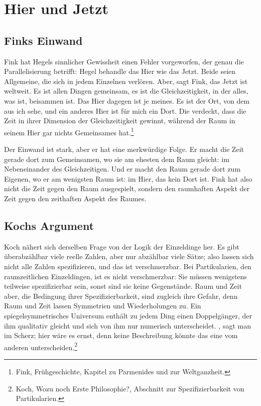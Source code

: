 \chapter{Hier und Jetzt}

\section{Finks Einwand}

Fink hat Hegels sinnlicher Gewissheit einen Fehler vorgeworfen, der genau die Parallelisierung betrifft: Hegel behandle das Hier wie das Jetzt. Beide seien Allgemeine, die sich in jedem Einzelnen verlören. Aber, sagt Fink, das Jetzt ist weltweit. Es ist allen Dingen gemeinsam, es ist die Gleichzeitigkeit, in der alles, was ist, beisammen ist. Das Hier dagegen ist je meines. Es ist der Ort, von dem aus ich sehe, und ein anderes Hier ist für mich ein Dort. Die  verdeckt, dass die Zeit in ihrer Dimension der Gleichzeitigkeit  gewinnt, während der Raum in seinem Hier gar nichts Gemeinsames hat.\footnote{Fink, Frühgeschichte, Kapitel zu Parmenides und zur Weltganzheit.}

Der Einwand ist stark, aber er hat eine merkwürdige Folge. Er macht die Zeit gerade dort zum Gemeinsamen, wo sie am ehesten dem Raum gleicht: im Nebeneinander des Gleichzeitigen. Und er macht den Raum gerade dort zum Eigenen, wo er am wenigsten Raum ist: im Hier, das kein Dort ist. Fink hat also nicht die Zeit gegen den Raum ausgespielt, sondern den raumhaften Aspekt der Zeit gegen den zeithaften Aspekt des Raumes.

\section{Kochs Argument}

Koch nähert sich derselben Frage von der Logik der Einzeldinge her. Es gibt überabzählbar viele reelle Zahlen, aber nur abzählbar viele Sätze; also lassen sich nicht alle Zahlen spezifizieren, und das ist verschmerzbar. Bei Partikularien, den raumzeitlichen Einzeldingen, ist es nicht verschmerzbar: Sie müssen wenigstens teilweise spezifizierbar sein, sonst sind sie keine Gegenstände. Raum und Zeit aber, die Bedingung ihrer Spezifizierbarkeit, sind zugleich ihre Gefahr, denn Raum und Zeit lassen Symmetrien und Wiederholungen zu. Ein spiegelsymmetrisches Universum enthält zu jedem Ding einen Doppelgänger, der ihm qualitativ gleicht und sich von ihm nur numerisch unterscheidet. , sagt man im Scherz; hier wäre es ernst, denn keine Beschreibung könnte das eine vom anderen unterscheiden.\footnote{Koch, Wozu noch Erste Philosophie?, Abschnitt zur Spezifizierbarkeit von Partikularien.}

